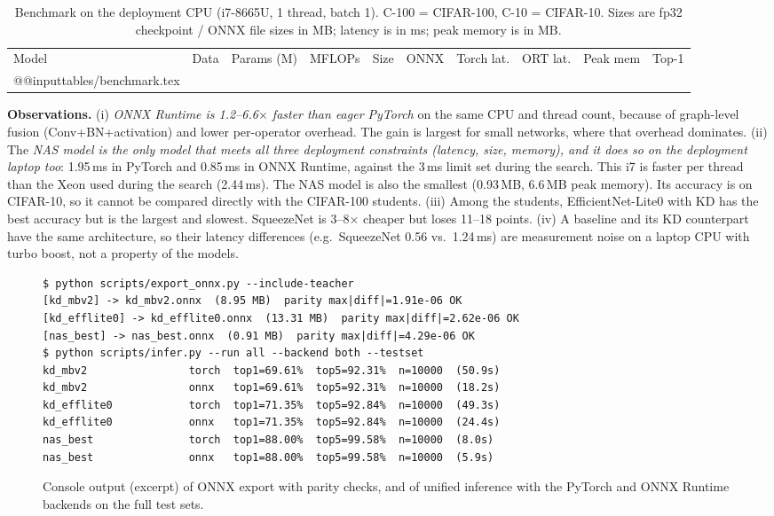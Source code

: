 \documentclass[10pt,a4paper]{article}
\makeatletter
\newcommand{\toprule}{\noalign{\hrule height 0.8pt}}
\newcommand{\midrule}{\noalign{\hrule height 0.4pt}}
\newcommand{\bottomrule}{\noalign{\hrule height 0.8pt}}
\newcommand{\tabinput}[1]{\csname @@input\endcsname #1 }
\makeatother
\begin{document}
\begin{table}[h]\centering\small
\caption{Benchmark on the deployment CPU (i7-8665U, 1 thread, batch 1). C-100 = CIFAR-100, C-10 = CIFAR-10.
Sizes are fp32 checkpoint / ONNX file sizes in MB; latency is in ms; peak memory is in MB.}
\label{tab:bench}
\begin{tabular}{lcrrrrrrrr}
\toprule
Model & Data & Params (M) & MFLOPs & Size & ONNX & Torch lat. & ORT lat. & Peak mem & Top-1 \\
\midrule
\tabinput{tables/benchmark.tex}
\bottomrule
\end{tabular}
\end{table}

\textbf{Observations.} (i) \emph{ONNX Runtime is 1.2--6.6$\times$ faster than eager PyTorch} on the
same CPU and thread count, because of graph-level fusion (Conv+BN+activation) and lower per-operator
overhead. The gain is largest for small networks, where that overhead dominates.
(ii) The \emph{NAS model is the only model that meets all three deployment constraints (latency, size, memory), and it does so on the deployment laptop too}:
1.95\,ms in PyTorch and 0.85\,ms in ONNX Runtime, against the 3\,ms limit set during the search.
This i7 is faster per thread than the Xeon used during the search (2.44\,ms). The NAS model is also the
smallest (0.93\,MB, 6.6\,MB peak memory). Its accuracy is on CIFAR-10, so it cannot be compared
directly with the CIFAR-100 students.
(iii) Among the students, EfficientNet-Lite0 with KD has the best accuracy but is the largest and slowest.
SqueezeNet is 3--8$\times$ cheaper but loses 11--18 points.
(iv) A baseline and its KD counterpart have the same architecture, so their latency differences
(e.g.\ SqueezeNet 0.56 vs.\ 1.24\,ms) are measurement noise on a laptop CPU with turbo boost, not a property
of the models.

\begin{figure}[h]
\centering
\begin{minipage}{0.97\linewidth}
\scriptsize
\begin{verbatim}
$ python scripts/export_onnx.py --include-teacher
[kd_mbv2] -> kd_mbv2.onnx  (8.95 MB)  parity max|diff|=1.91e-06 OK
[kd_efflite0] -> kd_efflite0.onnx  (13.31 MB)  parity max|diff|=2.62e-06 OK
[nas_best] -> nas_best.onnx  (0.91 MB)  parity max|diff|=4.29e-06 OK
$ python scripts/infer.py --run all --backend both --testset
kd_mbv2                torch  top1=69.61%  top5=92.31%  n=10000  (50.9s)
kd_mbv2                onnx   top1=69.61%  top5=92.31%  n=10000  (18.2s)
kd_efflite0            torch  top1=71.35%  top5=92.84%  n=10000  (49.3s)
kd_efflite0            onnx   top1=71.35%  top5=92.84%  n=10000  (24.4s)
nas_best               torch  top1=88.00%  top5=99.58%  n=10000  (8.0s)
nas_best               onnx   top1=88.00%  top5=99.58%  n=10000  (5.9s)
\end{verbatim}
\end{minipage}
\caption{Console output (excerpt) of ONNX export with parity checks, and of unified inference
with the PyTorch and ONNX Runtime backends on the full test sets.}
\label{fig:console}
\end{figure}
\end{document}
